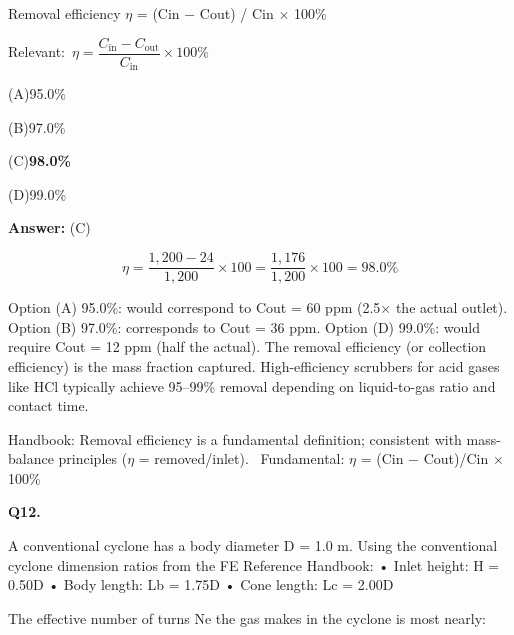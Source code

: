 \documentclass[11pt]{article}
\newcommand{\correct}[1]{\textbf{#1}\;{\color{accent}$\checkmark$}}
\newcommand{\optline}[2]{\par\noindent\hspace{1.2em}(#1)\hspace{0.6em}#2}
\begin{document}
Removal efficiency $\eta$ = (Cin $-$ Cout) / Cin $\times$ 100\%\par\vspace{3pt}
{\small\color{soft}Relevant:}\ $\eta = \dfrac{C_{\text{in}} - C_{\text{out}}}{C_{\text{in}}} \times 100\%$\par\vspace{3pt}
\optline{A}{95.0\%}
\optline{B}{97.0\%}
\optline{C}{\correct{98.0\%}}
\optline{D}{99.0\%}
\par\vspace{3pt}
\vspace{2pt}\par\noindent\colorbox{boxbg}{\parbox{\dimexpr\linewidth-2\fboxsep\relax}{%
\vspace{2pt}\textbf{Answer:} (C)\par\vspace{2pt}
{\small \[\eta = \frac{1{,}200 - 24}{1{,}200} \times 100 = \frac{1{,}176}{1{,}200} \times 100 = 98.0\%\]

Option (A) 95.0\%: would correspond to Cout = 60 ppm (2.5$\times$ the actual outlet). Option (B) 97.0\%: corresponds to Cout = 36 ppm. Option (D) 99.0\%: would require Cout = 12 ppm (half the actual). The removal efficiency (or collection efficiency) is the mass fraction captured. High-efficiency scrubbers for acid gases like HCl typically achieve 95--99\% removal depending on liquid-to-gas ratio and contact time.}\par\vspace{2pt}
{\footnotesize\color{soft}Handbook: Removal efficiency is a fundamental definition; consistent with mass-balance principles ($\eta$ = removed/inlet). \textbullet\ Fundamental: $\eta$ = (Cin $-$ Cout)/Cin $\times$ 100\%}\vspace{2pt}
}}
\vspace{9pt}
\filbreak
\textbf{\color{accent}Q12.}\par\vspace{2pt}
A conventional cyclone has a body diameter D = 1.0 m. Using the conventional cyclone dimension ratios from the FE Reference Handbook:
• Inlet height: H = 0.50D
• Body length: Lb = 1.75D
• Cone length: Lc = 2.00D

The effective number of turns Ne the gas makes in the cyclone is most nearly:
\end{document}
